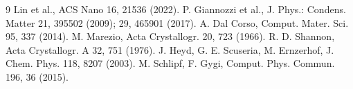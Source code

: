 \documentclass[9pt]{extarticle}
\begin{document}
\vspace{-4pt}
\renewcommand{\refname}{\normalsize References}
{\footnotesize
\begin{thebibliography}{9}\setlength{\itemsep}{-2pt}
 Lin et al., ACS Nano 16, 21536 (2022).
 P. Giannozzi et al., J. Phys.: Condens. Matter 21, 395502 (2009); 29, 465901 (2017).
 A. Dal Corso, Comput. Mater. Sci. 95, 337 (2014).
 M. Marezio, Acta Crystallogr. 20, 723 (1966).
 R. D. Shannon, Acta Crystallogr. A 32, 751 (1976).
 J. Heyd, G. E. Scuseria, M. Ernzerhof, J. Chem. Phys. 118, 8207 (2003).
 M. Schlipf, F. Gygi, Comput. Phys. Commun. 196, 36 (2015).
\end{thebibliography}}
\end{document}
